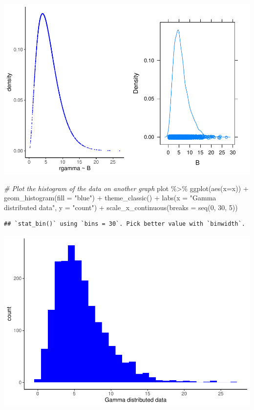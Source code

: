 \documentclass[
  10pt,
]{article}
\newenvironment{Shaded}{\begin{snugshade}}{\end{snugshade}}
\newcommand{\AttributeTok}[1]{\textcolor[rgb]{0.77,0.63,0.00}{#1}}
\newcommand{\CommentTok}[1]{\textcolor[rgb]{0.56,0.35,0.01}{\textit{#1}}}
\newcommand{\DecValTok}[1]{\textcolor[rgb]{0.00,0.00,0.81}{#1}}
\newcommand{\FunctionTok}[1]{\textcolor[rgb]{0.00,0.00,0.00}{#1}}
\newcommand{\NormalTok}[1]{#1}
\newcommand{\SpecialCharTok}[1]{\textcolor[rgb]{0.00,0.00,0.00}{#1}}
\newcommand{\StringTok}[1]{\textcolor[rgb]{0.31,0.60,0.02}{#1}}
\begin{document}
\includegraphics{Heimaverkefni-1_files/figure-latex/unnamed-chunk-8-1.pdf}
\newpage

\begin{Shaded}
\begin{Highlighting}[]
\CommentTok{\# Plot the histogram of the data on another graph}
\NormalTok{plot }\SpecialCharTok{\%\textgreater{}\%}
  \FunctionTok{ggplot}\NormalTok{(}\FunctionTok{aes}\NormalTok{(}\AttributeTok{x=}\NormalTok{x)) }\SpecialCharTok{+}
  \FunctionTok{geom\_histogram}\NormalTok{(}\AttributeTok{fill =} \StringTok{"blue"}\NormalTok{) }\SpecialCharTok{+}
  \FunctionTok{theme\_classic}\NormalTok{() }\SpecialCharTok{+}
  \FunctionTok{labs}\NormalTok{(}\AttributeTok{x =} \StringTok{"Gamma distributed data"}\NormalTok{,}
       \AttributeTok{y =} \StringTok{"count"}\NormalTok{) }\SpecialCharTok{+}
  \FunctionTok{scale\_x\_continuous}\NormalTok{(}\AttributeTok{breaks =} \FunctionTok{seq}\NormalTok{(}\DecValTok{0}\NormalTok{, }\DecValTok{30}\NormalTok{, }\DecValTok{5}\NormalTok{))}
\end{Highlighting}
\end{Shaded}

\begin{verbatim}
## `stat_bin()` using `bins = 30`. Pick better value with `binwidth`.
\end{verbatim}

\includegraphics{Heimaverkefni-1_files/figure-latex/unnamed-chunk-9-1.pdf}
\end{document}
